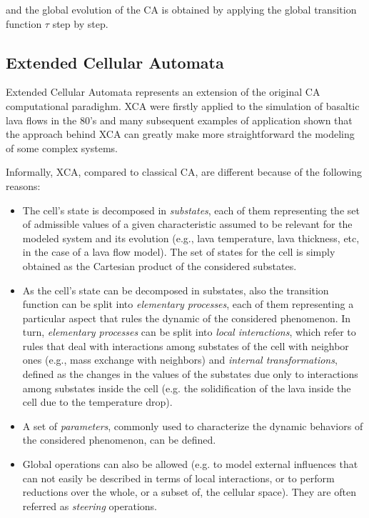     \noindent and the global evolution of the CA is obtained by
    applying the global transition function $\tau$ step by step.


  \subsection{Extended Cellular Automata}
    Extended Cellular Automata \cite{DiGregorio&Serra-1999} represents
    an extension of the original CA computational paradighm. XCA were
    firstly applied to the simulation of basaltic lava flows in the
    80's \cite{Crisci&al-1982} and many subsequent examples of
    application shown that the approach behind XCA can greatly make
    more straightforward the modeling of some complex systems.

    Informally, XCA, compared to classical CA, are different because
    of the following reasons:

    \begin{itemize}

    \item The cell's state is decomposed in \emph{substates}, each of them
      representing the set of admissible values of a given characteristic
      assumed to be relevant for the modeled system and its evolution
      (e.g., lava temperature, lava thickness, etc, in the case of a lava
      flow model). The set of states for the cell is simply obtained as
      the Cartesian product of the considered substates.

    \item As the cell's state can be decomposed in substates, also the
      transition function can be split into \emph{elementary processes},
      each of them representing a particular aspect that rules the dynamic
      of the considered phenomenon. In turn, \emph{elementary processes}
      can be split into \emph{local interactions}, which refer to rules
      that deal with interactions among substates of the cell with
      neighbor ones (e.g., mass exchange with neighbors) and
      \emph{internal transformations}, defined as the changes in the
      values of the substates due only to interactions among substates
      inside the cell (e.g. the solidification of the lava inside the cell
      due to the temperature drop).

    \item A set of \emph{parameters}, commonly used to characterize the
      dynamic behaviors of the considered phenomenon, can be defined.

    \item Global operations can also be allowed (e.g. to model external
      influences that can not easily be described in terms of local
      interactions, or to perform reductions over the whole, or a subset
      of, the cellular space). They are often referred as \emph{steering}
      operations.

    \end{itemize}

